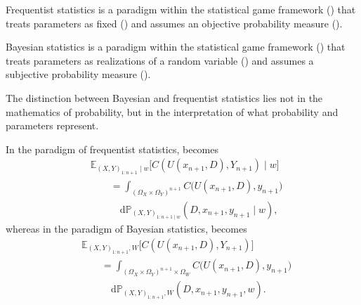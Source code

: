 \begin{definition}
	\label{def:frequentist_statistics}
	Frequentist statistics is a paradigm within the statistical game framework () that treats parameters as fixed () and assumes an objective probability measure ().
\end{definition}

\begin{definition}
	\label{def:bayesian_statistics}
	Bayesian statistics is a paradigm within the statistical game framework () that treats parameters as realizations of a random variable () and assumes a subjective probability measure ().
\end{definition}


\begin{remark}[Inference]
	The distinction between Bayesian and frequentist statistics lies not in the mathematics of probability, but in the interpretation of what probability and parameters represent.
\end{remark}

\begin{remark}
	\label{rem:frequentist_bayesian_expected_cost}
	In the paradigm of frequentist statistics,  becomes
	\begin{equation}
		\begin{split}
			&\mathbb{E}_{(X,Y)_{1\colon n+1}\mid w}\big[C(U(x_{n+1},D),Y_{n+1})\mid w\big] \\
			&\qquad= \int_{(\Omega_X\times\Omega_Y)^{n+1}}
			C\big(U(x_{n+1},D),y_{n+1}\big)\\
			&\qquad\quad \mathrm{d}\mathbb{P}_{(X,Y)_{1\colon n+1\mid w}}(D,x_{n+1},y_{n+1}\mid w),
		\end{split}
		\label{eq:expcost5}
	\end{equation}
 	whereas in the paradigm of Bayesian statistics,  becomes
 	\begin{equation}
 		\begin{split}
 			&\mathbb{E}_{(X,Y)_{1\colon n+1},W}\big[C(U(x_{n+1},D),Y_{n+1})\big] \\
 			&\qquad= \int_{(\Omega_X\times\Omega_Y)^{n+1}\times\Omega_W}
 			C\big(U(x_{n+1},D),y_{n+1}\big)\\
 			&\qquad\quad
 			\mathrm{d}\mathbb{P}_{(X,Y)_{1\colon n+1},W }(D,x_{n+1},y_{n+1},w).
 		\end{split}
 		\label{eq:expcost6}
 	\end{equation}
\end{remark}



